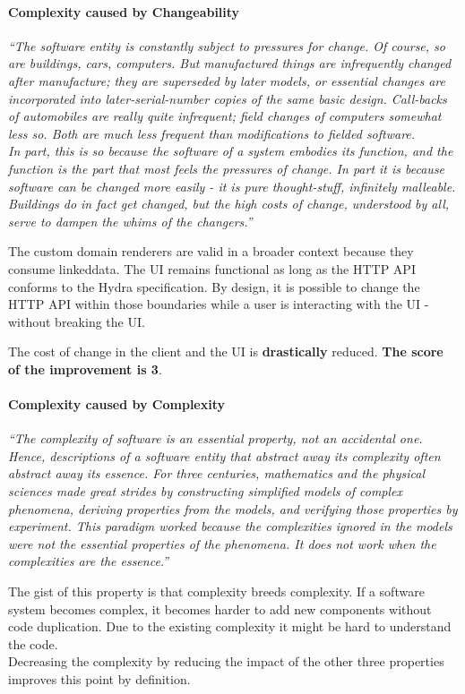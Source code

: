 \paragraph{Complexity caused by Changeability}
\textit{``The software entity is constantly subject to pressures for change. Of course, so are buildings, cars, computers. But manufactured things are infrequently changed after manufacture; they are superseded by later models, or essential changes are incorporated into later-serial-number copies of the same basic design. Call-backs of automobiles are really quite infrequent; field changes of computers somewhat less so. Both are much less frequent than modifications to fielded software. \\ In part, this is so because the software of a system embodies its function, and the function is the part that most feels the pressures of change. In part it is because software can be changed more easily - it is pure thought-stuff, infinitely malleable. Buildings do in fact get changed, but the high costs of change, understood by all, serve to dampen the whims of the changers.''} \citep[p.~4]{nosilverbullet}

The custom domain renderers are valid in a broader context because they consume \gls{linkeddata}. The UI remains functional as long as the HTTP API conforms to the Hydra specification. By design, it is possible to change the HTTP API within those boundaries while a user is interacting with the UI - without breaking the UI.

The cost of change in the client and the UI is \textbf{drastically} reduced. \textbf{The score of the improvement is 3}.

\paragraph{Complexity caused by Complexity}
\textit{``The complexity of software is an essential property, not an accidental one. Hence, descriptions of a software entity that abstract away its complexity often abstract away its essence. For three centuries, mathematics and the physical sciences made great strides by constructing simplified models of complex phenomena, deriving properties from the models, and verifying those properties by experiment. This paradigm worked because the complexities ignored in the models were not the essential properties of the phenomena. It does not work when the complexities are the essence.''} \citep[p.~3]{nosilverbullet}

The gist of this property is that complexity breeds complexity. If a software system becomes complex, it becomes harder to add new components without code duplication. Due to the existing complexity it might be hard to understand the code. \\ Decreasing the complexity by reducing the impact of the other three properties improves this point by definition.

